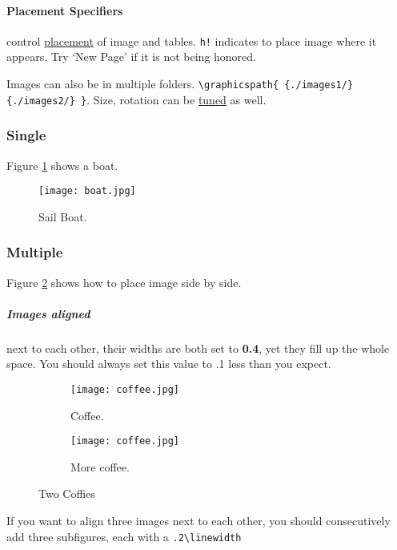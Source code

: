\documentclass{report}[a4paper,12pt] %
\begin{document}
\paragraph{Placement Specifiers} control \href{https://www.overleaf.com/learn/latex/Positioning_images_and_tables#The_figure_environment}{placement} of image and tables.
\verb|h!| indicates to place image where it appears. Try `New Page' if it is not being honored.

Images can also be in multiple folders. \verb|\graphicspath{ {./images1/}{./images2/} }|.
Size, rotation can be \href{https://www.overleaf.com/learn/latex/Inserting_Images}{tuned} as well.

\subsubsection{Single}

Figure \ref{fig:sailboat} shows a boat. %

\begin{figure}[h]
  \texttt{[image: boat.jpg]}
  \caption{Sail Boat.}
  \label{fig:sailboat} %
\end{figure}

\subsubsection{Multiple}
Figure \ref{fig:coffee} shows how to place image side by side.

\subparagraph{Images aligned} next to each other, their widths are both set to \textbf{0.4}, yet they fill up the whole space.
You should always set this value to .1 less than you expect.

\begin{figure}[h!]
  \centering
  \begin{subfigure}[b]{0.4\linewidth}
    \texttt{[image: coffee.jpg]}
    \caption{Coffee.}
  \end{subfigure}
  \begin{subfigure}[b]{0.4\linewidth}
    \texttt{[image: coffee.jpg]}
    \caption{More coffee.}
  \end{subfigure}
  \caption{Two Coffies}
  \label{fig:coffee}
\end{figure}

If you want to align three images next to each other,
you should consecutively add three subfigures, each with a \verb|.2\linewidth|
\end{document}
